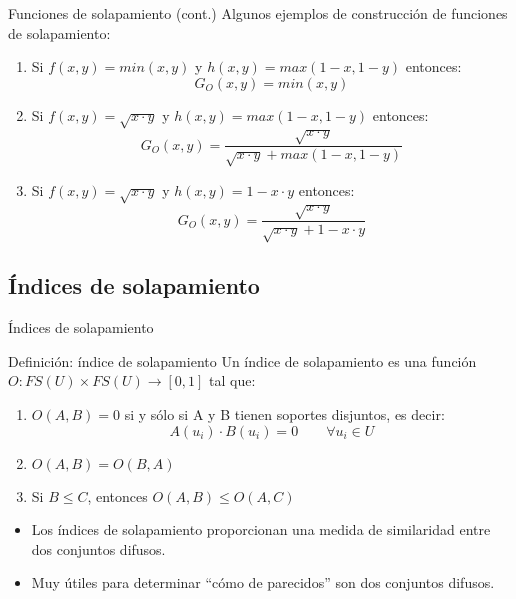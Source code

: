 \documentclass{beamer}
\begin{document}
\begin{frame}{Funciones de solapamiento (cont.)}
	Algunos ejemplos de construcción de funciones de solapamiento: 
	\vspace{0.5cm}
	\begin{enumerate}
		\item Si $f(x,y)=min(x,y)$ y $h(x,y) = max(1-x,1-y)$ entonces: 
		\begin{equation}
		G_{O}(x,y) = min(x,y)
		\end{equation}
		\item Si $f(x,y)=\sqrt{x \cdot y}$ y $h(x,y) = max(1-x,1-y)$ entonces: 
		\begin{equation}G_{O}(x,y) = \frac{\sqrt{x \cdot y}}{\sqrt{x \cdot y} + max(1-x,1-y)}
		\end{equation}
		\item Si $f(x,y)=\sqrt{x \cdot y}$ y $h(x,y) = 1 - x \cdot y $ entonces: 
		\begin{equation}G_{O}(x,y) = \frac{\sqrt{x \cdot y}}{\sqrt{x \cdot y} + 1 - x \cdot y}
		\end{equation}
	\end{enumerate}
\end{frame}
\fi

\subsection{Índices de solapamiento}
\begin{frame}{Índices de solapamiento}
	\begin{block}{Definición: índice de solapamiento}
		Un índice de solapamiento es una función $O : FS(U) \times FS(U) \rightarrow [0,1]$ tal que:
		\begin{enumerate}
		\item $O(A,B) = 0$ si y sólo si A y B tienen soportes disjuntos, es decir: 
			\begin{equation}
				A(u_{i}) \cdot B(u_{i}) = 0 \qquad \forall u_{i} \in U
			\end{equation}
		\item $O(A,B) = O(B,A)$\label{BO2}
		\item Si $B \leq C$, entonces $O(A,B) \leq O(A,C)$\label{BO3}
		\end{enumerate}
	\end{block}
	\begin{itemize}
		\item Los índices de solapamiento proporcionan una medida de similaridad entre dos conjuntos difusos.
		\item Muy útiles para determinar ``cómo de parecidos'' son dos conjuntos difusos.
	\end{itemize}
\end{frame}
\end{document}
